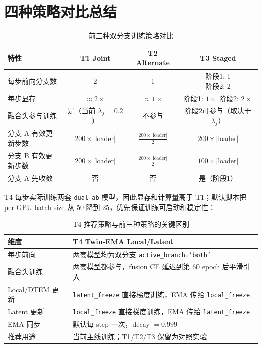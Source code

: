 \documentclass[a4paper,11pt]{article}
\begin{document}
\section{四种策略对比总结}

\begin{table}[h]
\centering
\caption{前三种双分支训练策略对比}
\begin{tabular}{l c c c}
\toprule
\textbf{特性} & \textbf{T1 Joint} & \textbf{T2 Alternate} & \textbf{T3 Staged} \\
\midrule
每步前向分支数 & 2 & 1 & \makecell{阶段1: 1 \\ 阶段2: 2} \\
每步显存 & $\approx 2\times$ & $\approx 1\times$ & \makecell{阶段1: $1\times$ \\ 阶段2: $2\times$} \\
融合头参与训练 & 是（当前 $\lambda_f=0.2$） & 不参与 & 阶段2可参与（取决于 $\lambda_f$） \\
分支 A 有效更新步数 & $200 \times |\text{loader}|$ & $\frac{200 \times |\text{loader}|}{2}$ & $200 \times |\text{loader}|$ \\
分支 B 有效更新步数 & $200 \times |\text{loader}|$ & $\frac{200 \times |\text{loader}|}{2}$ & $100 \times |\text{loader}|$ \\
分支 A 先收敛 & 否 & 否 & 是（阶段1） \\
\bottomrule
\end{tabular}
\end{table}

T4 每步实际训练两套 \texttt{dual\_ab} 模型，因此显存和计算量高于 T1；默认脚本把 per-GPU batch size 从 $50$ 降到 $25$，优先保证训练可启动和稳定性：

\begin{table}[h]
\centering
\caption{T4 推荐策略与前三种策略的关键区别}
\begin{tabular}{l l}
\toprule
\textbf{维度} & \textbf{T4 Twin-EMA Local/Latent} \\
\midrule
每步前向 & 两套模型均为双分支 \texttt{active\_branch='both'} \\
融合头训练 & 两套模型都参与，fusion CE 延迟到第 $60$ epoch 后平滑引入 \\
Local/DTEM 更新 & \texttt{latent\_freeze} 直接梯度训练，EMA 传给 \texttt{local\_freeze} \\
Latent 更新 & \texttt{local\_freeze} 直接梯度训练，EMA 传给 \texttt{latent\_freeze} \\
EMA 同步 & 默认每 step 一次，decay $=0.999$ \\
推荐用途 & 当前主线训练；T1/T2/T3 保留为对照实验 \\
\bottomrule
\end{tabular}
\end{table}
\end{document}
